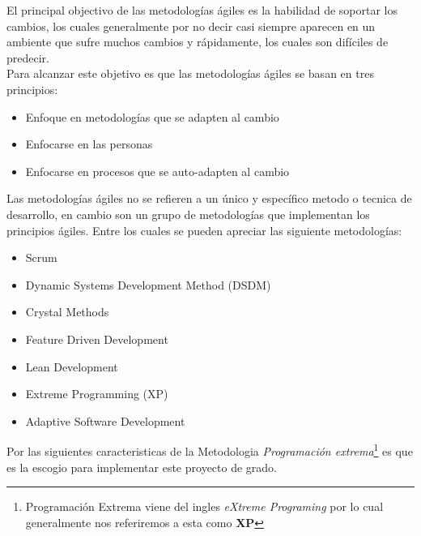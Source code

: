 
    El principal objectivo de las metodologías ágiles es la habilidad de soportar los cambios, los cuales generalmente por no decir casi siempre aparecen en un ambiente que sufre muchos cambios y rápidamente, los cuales son difíciles de predecir.\cite{design2005}\\


    Para alcanzar este objetivo es que las metodologías ágiles se basan en tres principios\cite{intro_agile_2015}:

\begin{itemize}
  \item Enfoque en metodologías que se adapten al cambio
  \item Enfocarse en las personas
  \item Enfocarse en procesos que se auto-adapten al cambio
\end{itemize}

    Las metodologías ágiles no se refieren a un único y específico metodo o tecnica de desarrollo, en cambio son un grupo de metodologías que implementan los principios ágiles. Entre los cuales se pueden apreciar las siguiente metodologías:\\

    \begin{itemize}
      \item Scrum
      \item Dynamic Systems Development Method (DSDM)
      \item Crystal Methods
      \item Feature Driven Development
      \item Lean Development
      \item Extreme Programming (XP)
      \item Adaptive Software Development
    \end{itemize}


    Por las siguientes caracteristicas de la Metodologia \emph{Programaci\'on extrema}\footnote{Programaci\'on Extrema viene del ingles \emph{eXtreme Programing} por lo cual generalmente nos referiremos a esta como \textbf{XP}} es que es la escogio para implementar este proyecto de grado.


